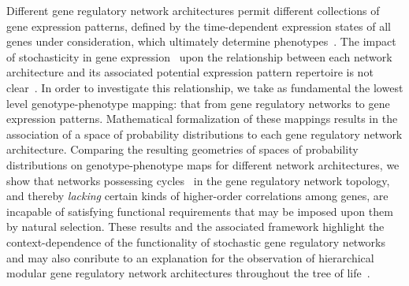 Different gene regulatory network architectures permit different collections of gene expression patterns, defined by the time-dependent expression states of all genes under consideration, which ultimately determine phenotypes~\cite{Alon2007,Milo2004}. The impact of stochasticity in gene expression~\cite{Eldar2010,Sanchez2013} upon the relationship between each network architecture and its associated potential expression pattern repertoire is not clear~\cite{Jothi2009,Golding2005,Lestas2010,Hilfinger2012,Chalancon2012}. In order to investigate this relationship, we take as fundamental the lowest level genotype-phenotype mapping: that from gene regulatory networks to gene expression patterns. Mathematical formalization of these mappings results in the association of a space of probability distributions to each gene regulatory network architecture. Comparing the resulting geometries of spaces of probability distributions on genotype-phenotype maps for different network architectures, we show that networks possessing cycles~\cite{Wainwright2007} in the gene regulatory network topology, and thereby \emph{lacking} certain kinds of higher-order correlations among genes, are incapable of satisfying functional requirements that may be imposed upon them by natural selection. These results and the associated framework highlight the context-dependence of the functionality of stochastic gene regulatory networks and may also conribute to an explanation for the observation of hierarchical modular gene regulatory network architectures throughout the tree of life~\cite{Ravasz2002,Segre2005,Wagner2007,Erwin2009,Jothi2009,Bhardwaj2010,Colm}.


